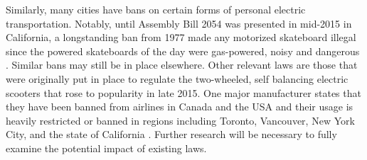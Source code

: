 Similarly, many cities have bans on certain forms of personal electric transportation. Notably, until Assembly Bill 2054 was presented in mid-2015 in California, a longstanding ban from 1977 made any motorized skateboard illegal since the powered skateboards of the day were gas-powered, noisy and dangerous \cite{OCLaws,WSJLaws}. Similar bans may still be in place elsewhere. Other relevant laws are those that were originally put in place to regulate the two-wheeled, self balancing electric scooters that rose to popularity in late 2015. One major manufacturer states that they have been banned from airlines in Canada and the USA and their usage is heavily restricted or banned in regions including Toronto, Vancouver, New York City, and the state of California \cite{leetboard}.
Further research will be necessary to fully examine the potential impact of existing laws.
